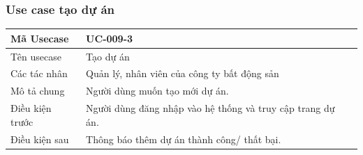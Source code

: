 \documentclass[12pt,a4paper]{article}
\begin{document}
    \subsubsection*{Use case tạo dự án}
    \begin{table}[H]
        \centering
        \begin{tabular}{|p{3.5cm}|p{11.5cm}|c|}
            \hline
            Mã Usecase      & UC-009-3                                                   \\
            \hline
            Tên usecase     & Tạo dự án                                                  \\
            \hline
            Các tác nhân    & Quản lý, nhân viên của công ty bất động sản                \\
            \hline
            Mô tả chung     & Người dùng muốn tạo mới dự án.                             \\
            \hline

            Điều kiện trước & Người dùng đăng nhập vào hệ thống và truy cập trang dự án. \\
            \hline

            Điều kiện sau   & Thông báo thêm dự án thành công/ thất bại.                 \\
            \hline


\end{tabular}
\end{table}
\end{document}
